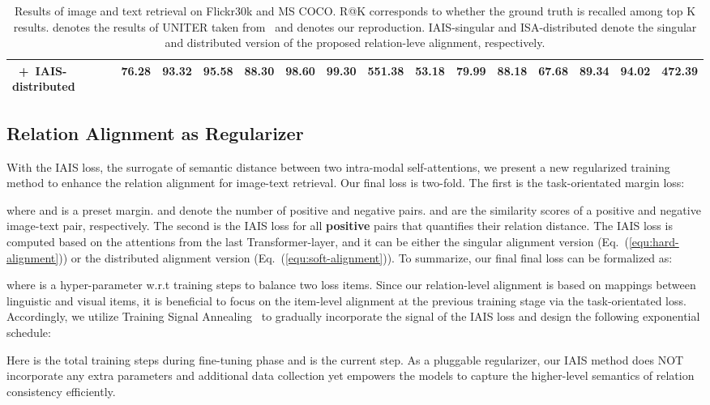 \documentclass[11pt,a4paper]{article}
\begin{document}
\begin{table*}[t]
\begin{adjustbox}{max width=\textwidth}
\begin{tabular}{@{}lcccccccccccccc@{}}
~+~IAIS-distributed &
  76.28 &
  93.32 &
  95.58 &
  \textbf{88.30} &
  \textbf{98.60} &
  99.30 &
  551.38 &
  \textbf{53.18} &
  79.99 &
  \textbf{88.18} &
  67.68 &
  89.34 &
  94.02 &
  472.39 \\ \bottomrule
\end{tabular}
\end{adjustbox}
\caption{Results of image and text retrieval on Flickr30k and MS COCO. 
R@K corresponds to whether the ground truth is recalled among top K results. 
 denotes the results of UNITER taken from~\citet{UNITER} and {} denotes our reproduction. IAIS-singular and ISA-distributed denote the singular and distributed version of the proposed relation-leve alignment, respectively. }
\label{tb:main-results}
\end{table*}


%
 
\subsection{Relation Alignment as Regularizer}
\label{subsec:Relation Alignment as Regularizer}
With the IAIS loss, the surrogate of semantic distance between two intra-modal self-attentions, we present a new regularized training method to enhance the relation alignment for image-text retrieval. 
Our final loss is two-fold. The first is the task-orientated margin loss:

where  and  is a preset margin. 
 and  denote the number of positive and negative pairs. 
 and  are the similarity scores of a positive and negative image-text pair, respectively. 
The second is the IAIS loss for all \textbf{positive} pairs that quantifies their relation distance. 
The IAIS loss is computed based on the attentions from the last Transformer-layer, and it can be either the singular alignment version (Eq.~(\ref{equ:hard-alignment})) or the distributed alignment version (Eq.~(\ref{equ:soft-alignment})). 
To summarize, our final final loss can be formalized as: 

where  is a hyper-parameter w.r.t training steps  to balance two loss items. 
Since our relation-level alignment is based on mappings between linguistic and visual items, it is beneficial to focus on the item-level alignment at the previous training stage via the task-orientated loss. Accordingly, we utilize Training Signal Annealing~\cite{uda} to gradually incorporate the signal of the IAIS loss and design the following exponential schedule:

Here  is the total training steps during fine-tuning phase and  is the current step. 
As a pluggable regularizer, our IAIS method does NOT incorporate any extra parameters and additional data collection yet empowers the models to capture the higher-level semantics of relation consistency efficiently. 
\end{document}
